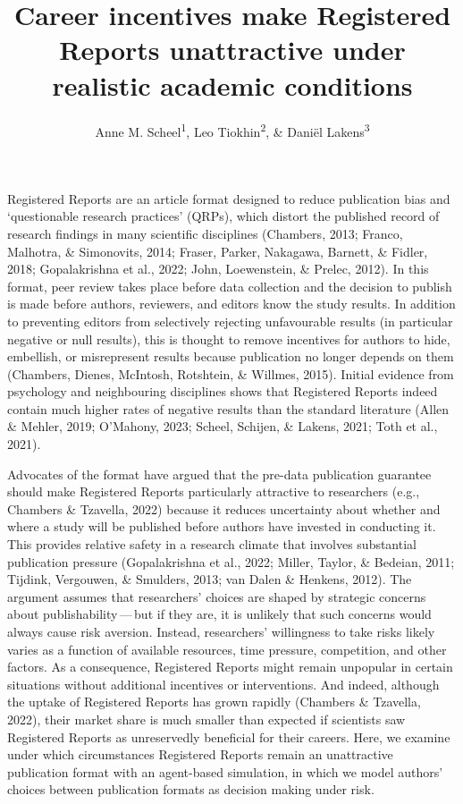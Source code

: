 \documentclass[
  british,
  a4paper,
  ,man,mask,floatsintext]{apa6}
\title{Career incentives make Registered Reports unattractive under realistic academic conditions}
\author{Anne M. Scheel\textsuperscript{1}, Leo Tiokhin\textsuperscript{2}, \& Daniël Lakens\textsuperscript{3}}
\date{}
\affiliation{\vspace{0.5cm}\textsuperscript{1} Utrecht University\\\textsuperscript{2} Deciding Better\\\textsuperscript{3} Eindhoven University of Technology}
\begin{document}
\maketitle

Registered Reports are an article format designed to reduce publication bias and `questionable research practices' (QRPs), which distort the published record of research findings in many scientific disciplines (Chambers, 2013; Franco, Malhotra, \& Simonovits, 2014; Fraser, Parker, Nakagawa, Barnett, \& Fidler, 2018; Gopalakrishna et al., 2022; John, Loewenstein, \& Prelec, 2012).
In this format, peer review takes place before data collection and the decision to publish is made before authors, reviewers, and editors know the study results.
In addition to preventing editors from selectively rejecting unfavourable results (in particular negative or null results), this is thought to remove incentives for authors to hide, embellish, or misrepresent results because publication no longer depends on them (Chambers, Dienes, McIntosh, Rotshtein, \& Willmes, 2015).
Initial evidence from psychology and neighbouring disciplines shows that Registered Reports indeed contain much higher rates of negative results than the standard literature (Allen \& Mehler, 2019; O'Mahony, 2023; Scheel, Schijen, \& Lakens, 2021; Toth et al., 2021).

Advocates of the format have argued that the pre-data publication guarantee should make Registered Reports particularly attractive to researchers (e.g., Chambers \& Tzavella, 2022)
because it reduces uncertainty about whether and where a study will be published before authors have invested in conducting it.
This provides relative safety in a research climate that involves substantial publication pressure (Gopalakrishna et al., 2022; Miller, Taylor, \& Bedeian, 2011; Tijdink, Vergouwen, \& Smulders, 2013; van Dalen \& Henkens, 2012).
The argument assumes that researchers' choices are shaped by strategic concerns about publishability\(\,\)---\(\,\)but if they are, it is unlikely that such concerns would always cause risk aversion.
Instead, researchers' willingness to take risks likely varies as a function of available resources, time pressure, competition, and other factors.
As a consequence, Registered Reports might remain unpopular in certain situations without additional incentives or interventions.
And indeed, although the uptake of Registered Reports has grown rapidly (Chambers \& Tzavella, 2022), their market share is much smaller than expected if scientists saw Registered Reports as unreservedly beneficial for their careers.
Here, we examine under which circumstances Registered Reports remain an unattractive publication format with an agent-based simulation, in which we model authors' choices between publication formats as decision making under risk.
\end{document}
